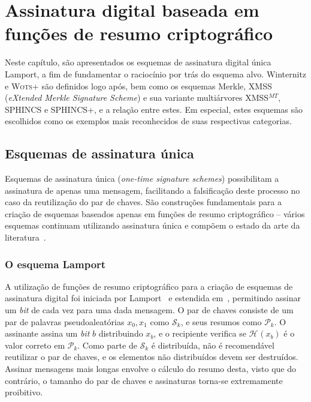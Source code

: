 \documentclass[12pt]{report}
\newcommand{\pk}{$\mathcal{P}_k$}
\newcommand{\sk}{$\mathcal{S}_k$}
\newcommand{\hash}[2][]{\mathcal{H}^{#1}(#2)}
\begin{document}
\chapter{Assinatura digital baseada em funções de resumo criptográfico}

Neste capítulo, são apresentados os esquemas de assinatura digital única Lamport, a fim de fundamentar o raciocínio por trás do esquema alvo. Winternitz e \textsc{Wots+} são definidos logo após, bem como os esquemas Merkle, XMSS (\emph{eXtended Merkle Signature Scheme}) e sua variante multiárvores XMSS$^{MT}$, SPHINCS e SPHINCS+, e a relação entre estes. Em especial, estes esquemas são escolhidos como os exemplos mais reconhecidos de suas respectivas categorias.

\section{Esquemas de assinatura única}

Esquemas de assinatura única (\emph{one-time signature schemes}) possibilitam a assinatura de apenas uma mensagem, facilitando a falsificação deste processo no caso da reutilização do par de chaves. São construções fundamentais para a criação de esquemas baseados apenas em funções de resumo criptográfico -- vários esquemas continuam utilizando assinatura única e compõem o estado da arte da literatura~\cite{sphincsplus,irtf-cfrg-xmss-hash-based-signatures-12}.

\subsection{O esquema Lamport}

A utilização de funções de resumo criptográfico para a criação de 
esquemas de assinatura digital foi iniciada por 
Lamport~\cite{Lamport1979} e estendida 
em~\cite{Diffie:2006:NDC:2263321.2269104}, permitindo assinar um 
\emph{bit} de cada vez para uma dada mensagem. O par de chaves consiste 
de um par de palavras pseudoaleatórias $x_0, x_1$ como \sk{}, e seus 
resumos como \pk{}. O assinante assina um \emph{bit} $b$ distribuindo 
$x_b$, e o recipiente verifica se $\hash{x_b}$ é o
valor correto em \pk{}. Como parte de \sk{} é distribuída, não é
recomendável reutilizar o par de chaves, e os elementos não
distribuídos devem ser destruídos. Assinar mensagens mais longas
envolve o cálculo do resumo desta, visto que do contrário, o
tamanho do par de chaves e assinaturas torna-se extremamente
proibitivo.
\end{document}
